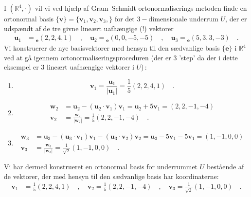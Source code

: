\begin{example} \label{exampLAbog8.11}
I $(\mathbb{R}^{4}, \cdot)$ vil vi ved hjælp af Gram--Schmidt ortonormaliserings-metoden finde en ortonormal basis $\{ \mathbf{v} \} = \{ \mathbf{v}_{1}, \mathbf{v}_{2}, \mathbf{v}_{3},\}$ for det $3-$dimensionale underrum $U$, der er udspændt af de tre givne lineært uafhængige (!) vektorer
\begin{equation*}
\begin{aligned}
\mathbf{u}_{1} &= {_{\mathbf{e}}(2,2,4,1)} \quad , \quad \mathbf{u}_{2} = {_{\mathbf{e}}(0,0,-5,-5)} \quad , \quad \mathbf{u}_{3} = {_{\mathbf{e}}(5,3,3,-3)} \quad .
\end{aligned}
\end{equation*}
Vi konstruerer de nye basisvektorer med hensyn til den sædvanlige basis $\{ \mathbf{e} \}$ i $\mathbb{R}^{4}$ ved at gå igennem ortonormaliseringsproceduren (der er $3$ 'step' da der i dette eksempel er $3$ lineært uafhængige vek\-to\-rer i $U$)\,:
\begin{enumerate}
\item
\begin{equation}
\mathbf{v}_{1} = \frac{\mathbf{u}_{1}}{\vert \mathbf{u}_{1} \vert} = \frac{1}{5}(2,2,4,1) \quad .
\end{equation}
\item
\begin{equation}
\begin{aligned}
\mathbf{w}_{2} &= \mathbf{u}_{2} - \left(\mathbf{u}_{2}\cdot\mathbf{v}_{1}\right)\mathbf{v}_{1} = \mathbf{u}_{2} + 5\mathbf{v}_{1} = (2,2,-1,-4)\\
\mathbf{v}_{2} &= \frac{\mathbf{w}_{2}}{\vert \mathbf{w}_{2} \vert} = \frac{1}{5}(2,2,-1, -4) \quad .
\end{aligned}
\end{equation}
\item
\begin{equation}
\begin{aligned}
\mathbf{w}_{3} &= \mathbf{u}_{3} - \left(\mathbf{u}_{3}\cdot\mathbf{v}_{1}\right)\mathbf{v}_{1} - \left(\mathbf{u}_{3}\cdot\mathbf{v}_{2}\right)\mathbf{v}_{2} = \mathbf{u}_{3} - 5\mathbf{v}_{1} - 5\mathbf{v}_{1} = (1,-1,0,0)\\
\mathbf{v}_{3} &= \frac{\mathbf{w}_{3}}{\vert \mathbf{w}_{3} \vert} = \frac{1}{\sqrt{2}}(1,-1,0,0) \quad .
\end{aligned}
\end{equation}
\end{enumerate}
Vi har dermed konstrueret en ortonormal basis for underrummet $U$ bestående af de vektorer, der med hensyn til den sædvanlige basis har koordinaterne:
\begin{equation*}
\begin{aligned}
\mathbf{v}_{1} &= \frac{1}{5}(2,2,4,1) \quad , \quad \mathbf{v}_{2} = \frac{1}{5}(2,2,-1,-4) \quad , \quad \mathbf{v}_{3} = \frac{1}{\sqrt{2}}(1,-1,0,0) \quad .
\end{aligned}
\end{equation*}


\end{example}
